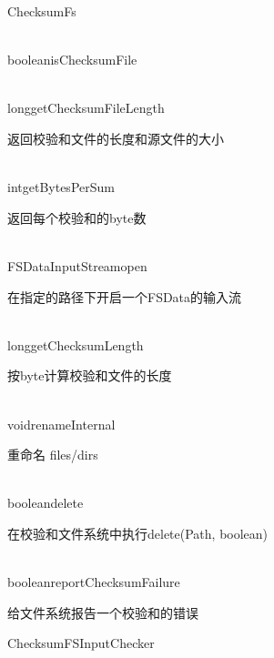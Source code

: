 \begin{XeClass}{ChecksumFs}
\begin{XeMethod}{\XePublic\\ }{boolean}{isChecksumFile}
  \end{XeMethod}

  \begin{XeMethod}{\XePublic\\ }{long}{getChecksumFileLength}
       
 返回校验和文件的长度和源文件的大小

  \end{XeMethod}

  \begin{XeMethod}{\XePublic\\ }{int}{getBytesPerSum}
       
 返回每个校验和的byte数

  \end{XeMethod}

  \begin{XeMethod}{\XePublic\\ }{FSDataInputStream}{open}
       
 在指定的路径下开启一个FSData的输入流

  \end{XeMethod}

  \begin{XeMethod}{\XePublic\\ }{long}{getChecksumLength}
       
 按byte计算校验和文件的长度

  \end{XeMethod}

  \begin{XeMethod}{\XePublic\\ }{void}{renameInternal}
       
 重命名 files/dirs

  \end{XeMethod}

  \begin{XeMethod}{\XePublic\\ }{boolean}{delete}
       
 在校验和文件系统中执行delete(Path, boolean)

  \end{XeMethod}

  \begin{XeMethod}{\XePublic\\ }{boolean}{reportChecksumFailure}
       
 给文件系统报告一个校验和的错误

  \end{XeMethod}

  \begin{XeInnerClass}{ChecksumFSInputChecker}
     

\end{XeInnerClass}
\end{XeClass}
